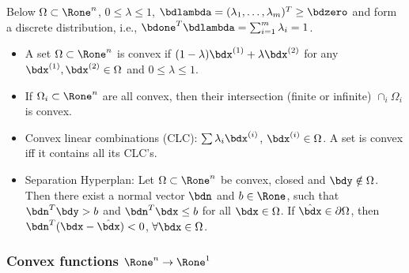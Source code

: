 \documentclass[a4paper]{article}
\begin{document}
Below
$\Omega\subset\Rone^n$,
$0\le \lambda\le 1$,
$\bdlambda=(\lambda_1,\ldots,\lambda_m)^T\ge\bdzero$
and form a discrete distribution, i.e.,
$\bdone^T\bdlambda=\sum_{i=1}^m \lambda_i=1$.

\begin{itemize}
  \item A set $\Omega\subset\Rone^n$ is convex if
    $(1-\lambda)\bdx^{(1)}+\lambda\bdx^{(2)}$
    for any
    $\bdx^{(1)},\bdx^{(2)}\in\Omega$ and
    $0\le\lambda\le1$.

  \item If $\Omega_i\subset\Rone^n$ are all convex, then their
    intersection (finite or infinite) $\cap_i \Omega_i$ is convex.

  \item Convex linear combinations (CLC):
    $\sum\lambda_i\bdx^{(i)}$, $\bdx^{(i)}\in\Omega$.
    A set is convex iff it contains all
    its CLC's.

  \item Separation Hyperplan: Let $\Omega\subset\Rone^n$ be convex,
    closed and $\bdy\notin\Omega$.
    Then there exist
    a normal vector $\bdn$ and $b\in\Rone$, such that $\bdn^T\bdy>b$
    and $\bdn^T\bdx\le b$ for all $\bdx\in\Omega$.
    If $\hat\bdx\in\partial\Omega$, then $\bdn^T(\bdx-\hat\bdx)<0$,
    $\forall\bdx\in\Omega$.
\end{itemize}

\subsubsection*{Convex functions $\Rone^n\to\Rone^1$}%
\end{document}

